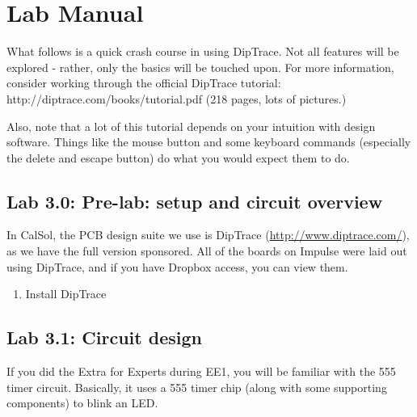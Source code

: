 \documentclass[letterpaper]{article}
\newcommand\liststyleRTFNumvi{%
\renewcommand\theenumi{\arabic{enumi}}
\renewcommand\theenumii{\alph{enumii}}
\renewcommand\theenumiii{\roman{enumiii}}
\renewcommand\theenumiv{\arabic{enumiv}}
\renewcommand\labelenumi{\theenumi.}
\renewcommand\labelenumii{\theenumii.}
\renewcommand\labelenumiii{\theenumiii.}
\renewcommand\labelenumiv{\theenumiv.}
}
\begin{document}
\section{Lab Manual}
\hypertarget{Toc337742694}{}{\sffamily\color[rgb]{0.30980393,0.5058824,0.7411765}
What follows is a quick crash course in using DipTrace. Not all features will be explored - rather, only the basics will
be touched upon. For more information, consider working through the official DipTrace tutorial:
http://diptrace.com/books/tutorial.pdf (218 pages, lots of pictures.)}


\bigskip

{\sffamily\color[rgb]{0.30980393,0.5058824,0.7411765}
Also, note that a lot of this tutorial depends on your intuition with design software. Things like the mouse button and
some keyboard commands (especially the delete and escape button) do what you would expect them to do.}


\bigskip

\subsection{Lab 3.0: Pre-lab: setup and circuit overview}
\hypertarget{Toc337742695}{}{\sffamily\color[rgb]{0.30980393,0.5058824,0.7411765}
In CalSol, the PCB design suite we use is DipTrace (\url{http://www.diptrace.com/}), as we have the full version
sponsored. All of the boards on Impulse were laid out using DipTrace, and if you have Dropbox access, you can view
them.}


\bigskip

\liststyleRTFNumvi
\begin{enumerate}
\item {\sffamily\color[rgb]{0.30980393,0.5058824,0.7411765}
Install DipTrace}
\end{enumerate}

\bigskip

\clearpage
\bigskip

\subsection{Lab 3.1: Circuit design}
\hypertarget{Toc337742696}{}{\sffamily\color[rgb]{0.30980393,0.5058824,0.7411765}
If you did the Extra for Experts during EE1, you will be familiar with the 555 timer circuit. Basically, it uses a 555
timer chip (along with some supporting components) to blink an LED.}
\end{document}
